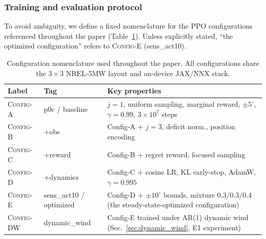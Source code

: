 \documentclass[final,5p,times]{elsarticle}
\begin{document}


\subsubsection{Training and evaluation protocol}
To avoid ambiguity, we define a fixed nomenclature for the PPO configurations referenced throughout the paper (Table~\ref{tab:config_names}). Unless explicitly stated, ``the optimized configuration'' refers to \textsc{Config-E} (sens\_act10).

\begin{table}[t]
\centering
\caption{Configuration nomenclature used throughout the paper. All configurations share the $3{\times}3$ NREL-5MW layout and on-device JAX/NNX stack.}
\label{tab:config_names}
\small
\begin{tabular}{llp{5.5cm}}
\toprule
Label & Tag & Key properties \\
\midrule
\textsc{Config-A} & p0c / baseline & $j{=}1$, uniform sampling, marginal reward, $\pm5^\circ$, $\gamma{=}0.99$, $3{\times}10^{7}$ steps \\
\textsc{Config-B} & +obs & Config-A $+$ $j{=}3$, deficit norm., position encoding \\
\textsc{Config-C} & +reward & Config-B $+$ regret reward, focused sampling \\
\textsc{Config-D} & +dynamics & Config-C $+$ cosine LR, KL early-stop, AdamW, $\gamma{=}0.995$ \\
\textsc{Config-E} & sens\_act10 / optimized & Config-D $+$ $\pm10^\circ$ bounds, mixture 0.3/0.3/0.4 (the steady-state-optimized configuration) \\
\textsc{Config-DW} & dynamic\_wind & Config-E trained under AR(1) dynamic wind (Sec.~\ref{sec:dynamic_wind}, E1 experiment) \\
\bottomrule
\end{tabular}
\end{table}
\end{document}
